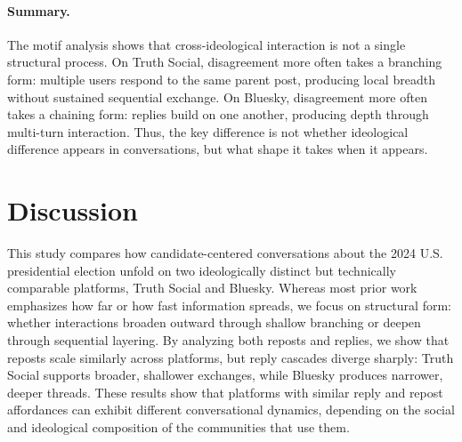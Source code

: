 \documentclass[letterpaper]{article} %
\newcommand{\cb}[1]{\textcolor{blue}{CB: #1}}
\newcommand{\rev}[1]{{\color{blue}#1}}
\begin{document}

\paragraph{Summary.}
The motif analysis shows that cross-ideological interaction is not a single structural process. On Truth Social, disagreement more often takes a branching form: multiple users respond to the same parent post, producing local breadth without sustained sequential exchange. On Bluesky, disagreement more often takes a chaining form: replies build on one another, producing depth through multi-turn interaction. Thus, the key difference is not whether ideological difference appears in conversations, but what shape it takes when it appears.



\section{Discussion}
This study compares how candidate-centered conversations about the 2024 U.S. presidential election unfold on two ideologically distinct but technically comparable platforms, Truth Social and Bluesky. Whereas most prior work emphasizes how far or how fast information spreads, we focus on structural form: whether interactions broaden outward through shallow branching or deepen through sequential layering. By analyzing both reposts and replies, we show that reposts scale similarly across platforms, but reply cascades diverge sharply: Truth Social supports broader, shallower exchanges, while Bluesky produces narrower, deeper threads. \rev{These results show that platforms with similar reply and repost affordances can exhibit different conversational dynamics, depending on the social and ideological composition of the communities that use them.}
\end{document}
